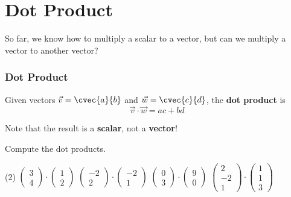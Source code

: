 \section{Dot Product}
\frame{\sectionpage}

\begin{frame}
So far, we know how to multiply a scalar to a vector, but can we multiply a vector to another vector?
\frametitle{Dot Product}
\begin{defn}{}{}
Given vectors $\vec{v} = \cvec{a}{b}$ and $\vec{w} = \cvec{c}{d}$, the \textbf{dot product} is 
\begin{equation}
\vec{v} \cdot \vec{w} = ac + bd
\end{equation}
\end{defn}
Note that the result is a \textbf{scalar}, not a \textbf{vector}!
\end{frame}


\begin{frame}[t]
\begin{ex}{}
Compute the dot products.
\begin{tasks}(2)
\task $\begin{pmatrix}3 \\ 4\end{pmatrix} \cdot \begin{pmatrix}1 \\ 2\end{pmatrix}$
\task $\begin{pmatrix}-2 \\ 2\end{pmatrix} \cdot \begin{pmatrix}-2 \\ 1\end{pmatrix}$
\task $\begin{pmatrix}0 \\ 3\end{pmatrix} \cdot \begin{pmatrix}9 \\ 0\end{pmatrix}$
\task $\begin{pmatrix}2 \\ -2 \\ 1\end{pmatrix} \cdot \begin{pmatrix}1 \\ 1 \\ 3\end{pmatrix}$
\end{tasks}
\end{ex}
\end{frame}


